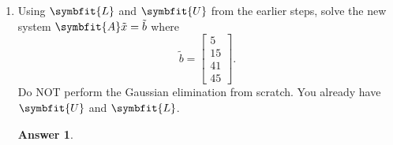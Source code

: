 \documentclass{article}
\theoremstyle{definition}
\newtheorem*{answer}{Answer}
\newcommand{\mat}[1]{\symbfit{#1}}
\begin{document}
\begin{enumerate}[leftmargin=\labelsep]
\begin{enumerate}
		      \item Using \(\mat{L}\) and \(\mat{U}\) from the earlier steps, solve the new system \(\mat{A}\tilde{x} = \tilde{b}\) where
		            \[
			            \tilde{b} =
			            \begin{bmatrix}
				            5 \\ 15 \\ 41 \\ 45
			            \end{bmatrix}.
		            \]
		            Do NOT perform the Gaussian elimination from scratch. You already have \(\mat{U}\) and \(\mat{L}\).
		            \begin{answer}

		            \end{answer}
	      \end{enumerate}


\end{enumerate}
\end{document}
